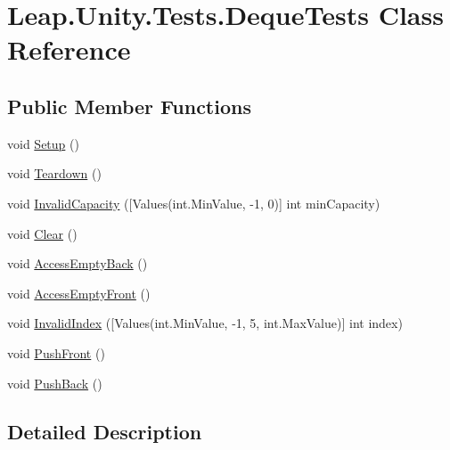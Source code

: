\hypertarget{class_leap_1_1_unity_1_1_tests_1_1_deque_tests}{}\section{Leap.\+Unity.\+Tests.\+Deque\+Tests Class Reference}
\label{class_leap_1_1_unity_1_1_tests_1_1_deque_tests}
\subsection*{Public Member Functions}
\begin{DoxyCompactItemize}
\item 
void \mbox{\hyperlink{class_leap_1_1_unity_1_1_tests_1_1_deque_tests_aff27587bf5cb6601d2dfb785bc5028cf}{Setup}} ()
\item 
void \mbox{\hyperlink{class_leap_1_1_unity_1_1_tests_1_1_deque_tests_a341ea1a3c0670c343a608938a45892c0}{Teardown}} ()
\item 
void \mbox{\hyperlink{class_leap_1_1_unity_1_1_tests_1_1_deque_tests_af64bfa74314ea49820b42c74a3fdfe75}{Invalid\+Capacity}} (\mbox{[}Values(int.\+Min\+Value, -\/1, 0)\mbox{]} int min\+Capacity)
\item 
void \mbox{\hyperlink{class_leap_1_1_unity_1_1_tests_1_1_deque_tests_ab69c3cd77db87189d116ef56a1287fab}{Clear}} ()
\item 
void \mbox{\hyperlink{class_leap_1_1_unity_1_1_tests_1_1_deque_tests_acfe07726cdcd5e9c4385ef35d91ef7a3}{Access\+Empty\+Back}} ()
\item 
void \mbox{\hyperlink{class_leap_1_1_unity_1_1_tests_1_1_deque_tests_ab3732969f94bcf4e018b1c18334fe621}{Access\+Empty\+Front}} ()
\item 
void \mbox{\hyperlink{class_leap_1_1_unity_1_1_tests_1_1_deque_tests_ade72d19588768201ee7f1d4a73946884}{Invalid\+Index}} (\mbox{[}Values(int.\+Min\+Value, -\/1, 5, int.\+Max\+Value)\mbox{]} int index)
\item 
void \mbox{\hyperlink{class_leap_1_1_unity_1_1_tests_1_1_deque_tests_a19bf9d5ed291919f2acf03ecb03aadf0}{Push\+Front}} ()
\item 
void \mbox{\hyperlink{class_leap_1_1_unity_1_1_tests_1_1_deque_tests_a173e70273f9b28eb7694d2195885d198}{Push\+Back}} ()
\end{DoxyCompactItemize}


\subsection{Detailed Description}


